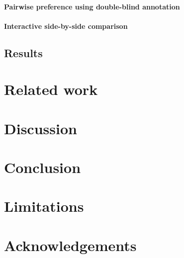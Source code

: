 \documentclass[11pt]{article}
\begin{document}
\paragraph{Pairwise preference using double-blind annotation}

\paragraph{Interactive side-by-side comparison}

\subsection{Results}

\section{Related work}
\section{Discussion}
\section{Conclusion}
\section{Limitations}

\section*{Acknowledgements}


\clearpage


\end{document}
